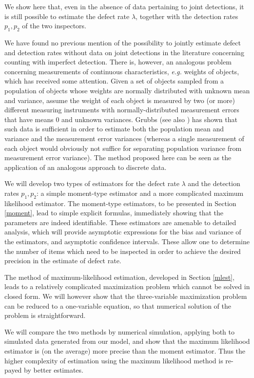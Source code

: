 \documentclass[a4paper,10pt,twoside]{article}
\begin{document}
We show here that, even in the absence of data pertaining to joint detections, it is still possible to 
estimate the defect rate $\lambda$, together with the detection rates $p_1,p_2$ of the two inspectors.

We have found no previous mention of the possibility to jointly estimate defect and detection rates without 
data on joint detections in the literature concerning counting with imperfect
detection. There is, however, an analogous problem concerning measurements of continuous characteristics, {\it{e.g.}} weights of 
	objects, which has received some attention. Given a set of objects sampled from a population of objects whose weights are normally
	distributed with unknown mean and variance, assume the weight of each object is measured by two (or more) different measuring 
	instruments with normally-distributed measurement errors that have means $0$ and unknown variances. Grubbs \cite{grubbs} (see also 
	\cite{grubbs1,lombard}) has shown that such data is sufficient in order to estimate both the population mean and variance and the measurement error variances (whereas a single measurement
	of each object would obviously not suffice for separating population variance from measurement error variance). The method
	proposed here can be seen as the application of an analogous approach to discrete data.

We will develop two types of estimators for the defect rate $\lambda$ and the detection rates $p_1,p_2$: a simple moment-type estimator and a more
complicated maximum likelihood estimator. 
The moment-type estimators, to be presented in Section \ref{moment},
lead to simple explicit formulas, immediately showing that the parameters are indeed identifiable.
These estimators are amenable to detailed analysis, which will provide asymptotic expressions for 
the bias and variance of the estimators, and asymptotic confidence intervals. These allow one to determine the number
of items which need to be inspected in order to achieve the desired precision in the estimate of defect rate.

The method of maximum-likelihood estimation, developed in Section \ref{mlest},
leads to a relatively complicated maximization problem which cannot be solved in closed form. We will however show that the three-variable maximization problem can be reduced to a one-variable equation, so that numerical solution
of the problem is straightforward.

We will compare the two methods by numerical simulation, applying both to simulated data generated from our model, and show that the maximum likelihood estimator is (on the average)  more precise than the moment estimator. Thus the higher complexity of estimation using the maximum likelihood method is re-payed by better estimates. 
\end{document}
